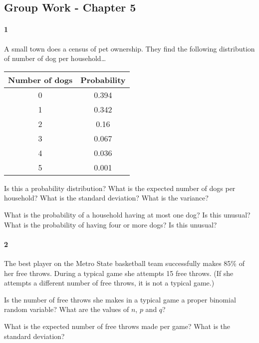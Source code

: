 \documentclass{article}
\begin{document}
\begin{flushleft}
\section*{Group Work - Chapter 5}
\paragraph{1} A small town does a census of pet ownership. They find the following distribution of number of dog per household\ldots\\
{\centering
\begin{tabular}{c | c}
Number of dogs & Probability\\
\hline
0 & 0.394\\
1 & 0.342\\
2 & 0.16\\
3 & 0.067\\
4 & 0.036\\
5 & 0.001\\
\end{tabular} \par}
\begin{enumalpha}
\item Is this a probability distribution? What is the expected number of dogs per household? What is the standard deviation? What is the variance?
\vspace{3in}
\item What is the probability of a household having at most one dog? Is this unusual? What is the probability of having four or more dogs? Is this unusual?
\end{enumalpha}



\newpage
\paragraph{2} The best player on the Metro State basketball team successfully makes 85\% of her free throws. During a typical game she attempts 15 free throws. (If she attempts a different number of free throws, it is not a typical game.)
\begin{enumalpha}
\item Is the number of free throws she makes in a typical game a proper binomial random variable? What are the values of $n$, $p$ and $q$?

\vspace{1.8in}
\item What is the expected number of free throws made per game? What is the standard deviation?


\end{enumalpha}
\end{flushleft}
\end{document}
